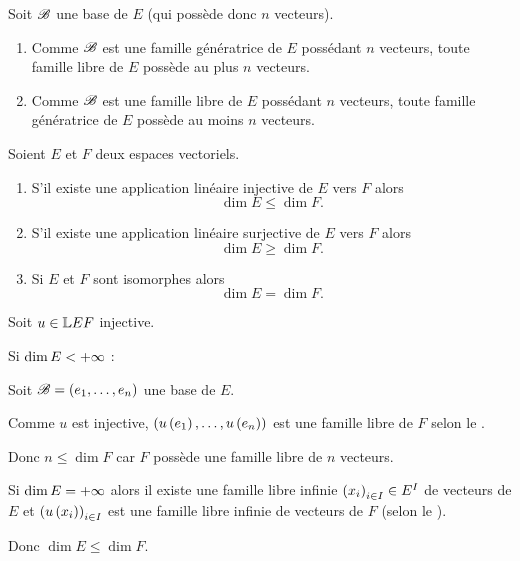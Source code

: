 \begin{dem}
Soit \(\mathscr{B}\) une base de \(E\) (qui possède donc \(n\) vecteurs).

\begin{enumerate}
\item Comme \(\mathscr{B}\) est une famille génératrice de \(E\) possédant \(n\) vecteurs, toute famille libre de \(E\) possède au plus \(n\) vecteurs. \\

\item Comme \(\mathscr{B}\) est une famille libre de \(E\) possédant \(n\) vecteurs, toute famille génératrice de \(E\) possède au moins \(n\) vecteurs.
\end{enumerate}
\end{dem}

\begin{prop}
Soient \(E\) et \(F\) deux espaces vectoriels.

\begin{enumerate}
\item S'il existe une application linéaire injective de \(E\) vers \(F\) alors \[\dim E\leq\dim F.\]

\item S'il existe une application linéaire surjective de \(E\) vers \(F\) alors \[\dim E\geq\dim F.\]

\item Si \(E\) et \(F\) sont isomorphes alors \[\dim E=\dim F.\]
\end{enumerate}
\end{prop}

\begin{dem}[1]
Soit \(u\in\mathbb{L}{E}{F}\) injective.

Si \(\dim E<+\infty\) :

Soit \(\mathscr{B}=\left(e_1,\dots,e_n\right)\) une base de \(E\).

Comme \(u\) est injective, \(\left(u\left(e_1\right),\dots,u\left(e_n\right)\right)\) est une famille libre de \(F\) selon le .

Donc \(n\leq\dim F\) car \(F\) possède une famille libre de \(n\) vecteurs.

Si \(\dim E=+\infty\) alors il existe une famille libre infinie \(\left(x_i\right)_{i\in I}\in E^I\) de vecteurs de \(E\) et \(\left(u\left(x_i\right)\right)_{i\in I}\) est une famille libre infinie de vecteurs de \(F\) (selon le ).

Donc \(\dim E\leq\dim F\).
\end{dem}

